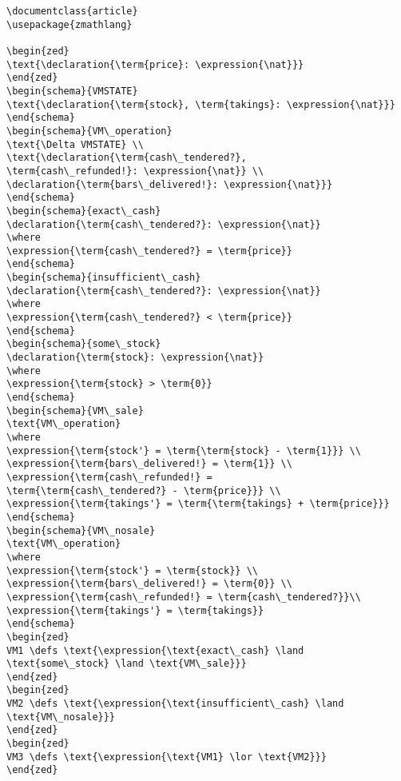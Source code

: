 \begin{verbatim}
\documentclass{article}
\usepackage{zmathlang}

\begin{zed}
\text{\declaration{\term{price}: \expression{\nat}}}
\end{zed}
\begin{schema}{VMSTATE}
\text{\declaration{\term{stock}, \term{takings}: \expression{\nat}}}
\end{schema}
\begin{schema}{VM\_operation}
\text{\Delta VMSTATE} \\
\text{\declaration{\term{cash\_tendered?},
\term{cash\_refunded!}: \expression{\nat}} \\
\declaration{\term{bars\_delivered!}: \expression{\nat}}}
\end{schema}
\begin{schema}{exact\_cash}
\declaration{\term{cash\_tendered?}: \expression{\nat}}
\where
\expression{\term{cash\_tendered?} = \term{price}}
\end{schema}
\begin{schema}{insufficient\_cash}
\declaration{\term{cash\_tendered?}: \expression{\nat}}
\where
\expression{\term{cash\_tendered?} < \term{price}}
\end{schema}
\begin{schema}{some\_stock}
\declaration{\term{stock}: \expression{\nat}}
\where
\expression{\term{stock} > \term{0}}
\end{schema}
\begin{schema}{VM\_sale}
\text{VM\_operation}
\where
\expression{\term{stock'} = \term{\term{stock} - \term{1}}} \\
\expression{\term{bars\_delivered!} = \term{1}} \\
\expression{\term{cash\_refunded!} =
\term{\term{cash\_tendered?} - \term{price}}} \\
\expression{\term{takings'} = \term{\term{takings} + \term{price}}}
\end{schema}
\begin{schema}{VM\_nosale}
\text{VM\_operation}
\where
\expression{\term{stock'} = \term{stock}} \\
\expression{\term{bars\_delivered!} = \term{0}} \\
\expression{\term{cash\_refunded!} = \term{cash\_tendered?}}\\
\expression{\term{takings'} = \term{takings}}
\end{schema}
\begin{zed}
VM1 \defs \text{\expression{\text{exact\_cash} \land
\text{some\_stock} \land \text{VM\_sale}}}
\end{zed}
\begin{zed}
VM2 \defs \text{\expression{\text{insufficient\_cash} \land
\text{VM\_nosale}}}
\end{zed}
\begin{zed}
VM3 \defs \text{\expression{\text{VM1} \lor \text{VM2}}}
\end{zed}

\end{verbatim}